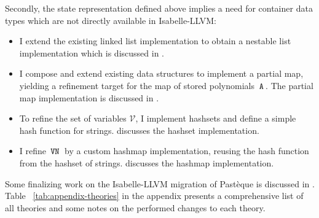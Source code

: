 Secondly, the state representation defined above implies a need for container data types which are not directly available in Isabelle-LLVM:
\begin{itemize}
    \item I extend the existing linked list implementation to obtain a nestable list implementation which is discussed in .
    \item I compose and extend existing data structures to implement a partial map, yielding a refinement target for the map of stored polynomials $\,\text{\ttfamily A}\,$.
        The partial map implementation is discussed in .
    \item To refine the set of variables $\mathscr{V}$, I implement hashsets and define a simple hash function for strings.
           discusses the hashset implementation.
    \item I refine $\,\text{\ttfamily VN}\,$ by a custom hashmap implementation, reusing the hash function from the hashset of strings.
           discusses the hashmap implementation.
\end{itemize}

Some finalizing work on the Isabelle-LLVM migration of Pastèque is discussed in .
Table ~\ref{tab:appendix-theories} in the appendix presents a comprehensive list of all theories and some notes on the performed changes to each theory.
